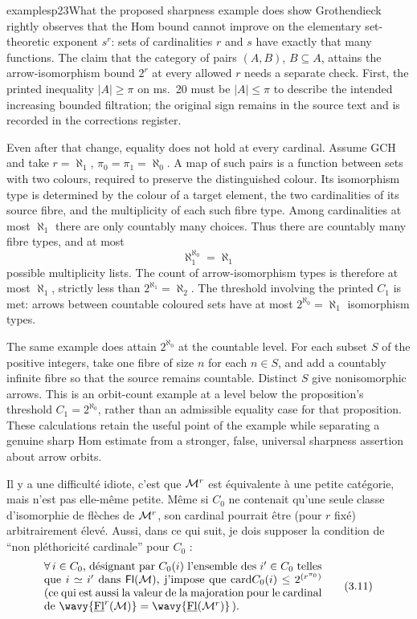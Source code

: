 \begin{dcomment}{examples}{p23}{What the proposed sharpness example does show}
Grothendieck rightly observes that the Hom bound cannot improve on the elementary set-theoretic exponent $s^r$: sets of cardinalities $r$ and $s$ have exactly that many functions. The claim that the category of pairs $(A,B)$, $B\subseteq A$, attains the arrow-isomorphism bound $2^r$ at every allowed $r$ needs a separate check. First, the printed inequality $|A|\geq\pi$ on ms.~20 must be $|A|\leq\pi$ to describe the intended increasing bounded filtration; the original sign remains in the source text and is recorded in the corrections register.

Even after that change, equality does not hold at every cardinal. Assume GCH and take $r=\aleph_1$, $\pi_0=\pi_1=\aleph_0$. A map of such pairs is a function between sets with two colours, required to preserve the distinguished colour. Its isomorphism type is determined by the colour of a target element, the two cardinalities of its source fibre, and the multiplicity of each such fibre type. Among cardinalities at most $\aleph_1$ there are only countably many choices. Thus there are countably many fibre types, and at most
\[
\aleph_1^{\aleph_0}=\aleph_1
\]
possible multiplicity lists. The count of arrow-isomorphism types is therefore at most $\aleph_1$, strictly less than $2^{\aleph_1}=\aleph_2$. The threshold involving the printed $C_1$ is met: arrows between countable coloured sets have at most $2^{\aleph_0}=\aleph_1$ isomorphism types.

The same example does attain $2^{\aleph_0}$ at the countable level. For each subset $S$ of the positive integers, take one fibre of size $n$ for each $n\in S$, and add a countably infinite fibre so that the source remains countable. Distinct $S$ give nonisomorphic arrows. This is an orbit-count example at a level below the proposition's threshold $C_1=2^{\aleph_0}$, rather than an admissible equality case for that proposition. These calculations retain the useful point of the example while separating a genuine sharp Hom estimate from a stronger, false, universal sharpness assertion about arrow orbits.
\end{dcomment}


 Il y a une difficulté idiote, c'est que $\mathcal{M}^r$ est équivalente à une petite catégorie, mais n'est pas elle-même petite. Même si $C_0$ ne contenait qu'une seule classe d'isomorphie de flèches de $\mathcal{M}^r$, son cardinal pourrait être (pour $r$ fixé) arbitrairement élevé. Aussi, dans ce qui suit, je dois supposer la condition de “non pléthoricité cardinale” pour $C_0$ :
\[
\parbox{0.72\linewidth}{$\forall\,i\in C_0$, désignant par $C_0(i)$ l'ensemble des $i'\in C_0$ telles que $i\simeq i'$ dans $\Fl(\M)$, j'impose que $\card C_0(i)\leq 2^{(r^{\pi_0})}$ (ce qui est aussi la valeur de la majoration pour le cardinal de $\wavy{\uFl^r(\M)}=\wavy{\uFl(\M^r)}$\,).} \tag*{(3.11)}
\]

